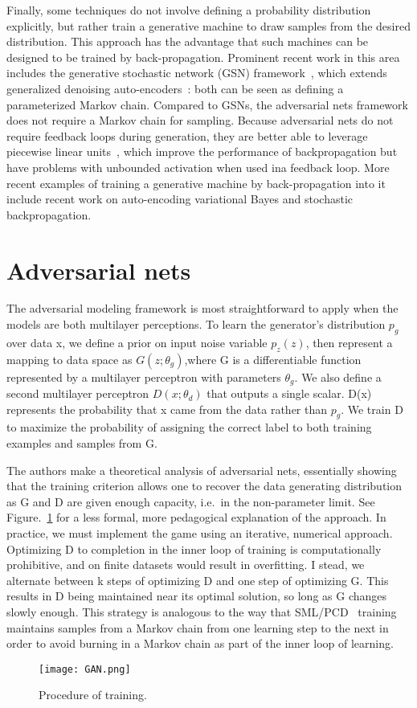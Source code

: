 \documentclass[10pt,twocolumn,letterpaper]{article}
\begin{document}
\par Finally, some techniques do not involve defining a probability distribution explicitly, but rather train a generative machine to draw samples from the desired distribution. This approach has the advantage that such machines can be designed to be trained by back-propagation. Prominent recent work in this area includes the generative stochastic network (GSN) framework~\cite{Bengio2014Deep}, which extends generalized denoising auto-encoders~\cite{Bengio2013Generalized}: both can be seen as defining a parameterized Markov chain. Compared to GSNs, the adversarial nets framework does not require a Markov chain for sampling. Because adversarial nets do not require feedback loops during generation, they are better able to leverage piecewise linear units~\cite{Jarrett2010What}, which improve the performance of backpropagation but have problems with unbounded activation when used ina feedback loop. More recent examples of training a generative machine by back-propagation into it include recent work on auto-encoding variational Bayes and stochastic backpropagation.
\section{Adversarial nets}
\par The adversarial modeling framework is most straightforward to apply when the models are both multilayer perceptions. To learn the generator's distribution $p_{g}$ over data x, we define a prior on input noise variable $p_{z}(z)$, then represent a mapping to data space as $G(z;\theta_{g})$,where G is a differentiable function represented by a multilayer perceptron with parameters $\theta_{g}$. We also define a second multilayer perceptron $D(x;\theta_{d})$ that outputs a single scalar. D(x) represents the probability that x came from the data rather than $p_{g}$. We train D to maximize the probability of assigning the correct label to both training examples and samples from G.
\par The authors make a theoretical analysis of adversarial nets, essentially showing that the training criterion allows one to recover the data generating distribution as G and D are given enough capacity, i.e.\ in the non-parameter limit. See Figure.~\ref{GAN} for a less formal, more pedagogical explanation of the approach. In practice, we must implement the game using an iterative, numerical approach. Optimizing D to completion in the inner loop of training is computationally prohibitive, and on finite datasets would result in overfitting. I stead, we alternate between k steps of optimizing D and one step of optimizing G. This results in D being maintained near its optimal solution, so long as G changes slowly enough. This strategy is analogous to the way that SML/PCD~\cite{younes1999convergence} training maintains samples from a Markov chain from one learning step to the next in order to avoid burning in a Markov chain as part of the inner loop of learning.
\begin{figure}[htbp]
	\centering{}
	\texttt{[image: GAN.png]}\\
	\caption{Procedure of training.}
	\label{GAN}
\end{figure}
\end{document}
